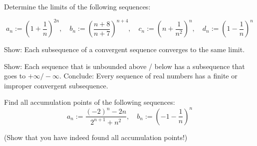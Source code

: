 \documentclass[week=4]{homework}
\date{\today}
\begin{document}
    \maketitle
    \thispagestyle{empty}
    \newpage
    \begin{questions}
		\let\firstquestion\question
		\renewcommand*{\question}{\vspace{7mm}\firstquestion}
        \firstquestion
        Determine the limits of the following sequences:
        
        \[
	        a_n := \left(1 + \frac{1}{n} \right)^{2n}, \quad b_n := \left(\frac{n+8}{n+7} \right)^{n+4}, \quad c_n := \left(n + \frac{1}{n^2} \right)^{n}, \quad d_n := \left(1 - \frac{1}{n} \right)^n
        \]
        
        \question 
        Show: Each subsequence of a convergent sequence converges to the same limit. 
        
        \question 
        Show: Each sequence that is unbounded above / below has a subsequence that goes to $+ \infty / - \infty$. Conclude: Every sequence of real numbers has a finite or improper convergent subsequence. 
        
        \question
        Find all accumulation points of the following sequences:
        \[
	        a_n := \frac{(-2)^n - 2n}{2^{n+1}+n^2}, \quad b_n := \left(-1-\frac{1}{n}\right)^n
        \]
        
        (Show that you have indeed found all accumulation points!)
        
\end{questions}
\end{document}
